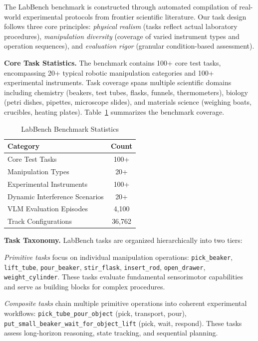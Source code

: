 \documentclass[letterpaper]{article} %
\begin{document}
The LabBench benchmark is constructed through automated compilation of real-world experimental protocols from frontier scientific literature. Our task design follows three core principles: \textit{physical realism} (tasks reflect actual laboratory procedures), \textit{manipulation diversity} (coverage of varied instrument types and operation sequences), and \textit{evaluation rigor} (granular condition-based assessment).

\textbf{Core Task Statistics.} The benchmark contains 100+ core test tasks, encompassing 20+ typical robotic manipulation categories and 100+ experimental instruments. Task coverage spans multiple scientific domains including chemistry (beakers, test tubes, flasks, funnels, thermometers), biology (petri dishes, pipettes, microscope slides), and materials science (weighing boats, crucibles, heating plates). Table~\ref{tab:task_statistics} summarizes the benchmark coverage.

\begin{table}[t]
\centering
\caption{LabBench Benchmark Statistics}
\label{tab:task_statistics}
\begin{tabular}{l|c}
\textbf{Category} & \textbf{Count} \\
\hline
Core Test Tasks & 100+ \\
Manipulation Types & 20+ \\
Experimental Instruments & 100+ \\
Dynamic Interference Scenarios & 20+ \\
VLM Evaluation Episodes & 4,100 \\
Track Configurations & 36,762 \\
\end{tabular}
\end{table}

\textbf{Task Taxonomy.} LabBench tasks are organized hierarchically into two tiers:

\textit{Primitive tasks} focus on individual manipulation operations: \texttt{pick\_beaker}, \texttt{lift\_tube}, \texttt{pour\_beaker}, \texttt{stir\_flask}, \texttt{insert\_rod}, \texttt{open\_drawer}, \texttt{weight\_cylinder}. These tasks evaluate fundamental sensorimotor capabilities and serve as building blocks for complex procedures.

\textit{Composite tasks} chain multiple primitive operations into coherent experimental workflows: \texttt{pick\_tube\_pour\_object} (pick, transport, pour), \texttt{put\_small\_beaker\_wait\_for\_object\_lift} (pick, wait, respond). These tasks assess long-horizon reasoning, state tracking, and sequential planning.
\end{document}
